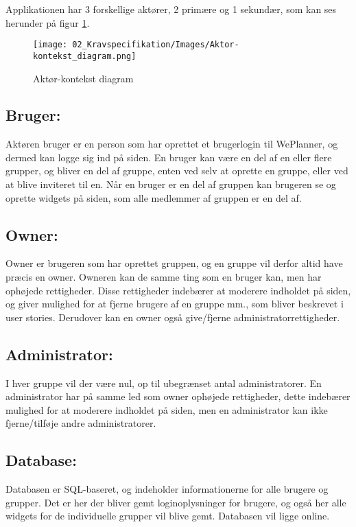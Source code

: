 Applikationen har 3 forskellige aktører, 2 primære og 1 sekundær, som kan ses herunder på figur \ref{fig:aktor_konteks}.
\begin{figure}[H]
  \texttt{[image: 02\_Kravspecifikation/Images/Aktor-kontekst\_diagram.png]}
  \caption{Aktør-kontekst diagram}
  \label{fig:aktor_konteks}
\end{figure}

\subsection{Bruger:}
Aktøren bruger er en person som har oprettet et brugerlogin til WePlanner, og dermed kan logge sig ind på siden. En bruger kan være en del af en eller flere grupper, og bliver en del af gruppe, enten ved selv at oprette en gruppe, eller ved at blive inviteret til en. Når en bruger er en del af gruppen kan brugeren se og oprette widgets på siden, som alle medlemmer af gruppen er en del af. 

\subsection{Owner:} 
Owner er brugeren som har oprettet gruppen, og en gruppe vil derfor altid have præcis en owner. Owneren kan de samme ting som en bruger kan, men har ophøjede rettigheder. Disse rettigheder indebærer at moderere indholdet på siden, og giver mulighed for at fjerne brugere af en gruppe mm., som bliver beskrevet i user stories. Derudover kan en owner også give/fjerne administratorrettigheder.

\subsection{Administrator:}
I hver gruppe vil der være nul, op til ubegrænset antal administratorer. En administrator har på samme led som owner ophøjede rettigheder, dette indebærer mulighed for at moderere indholdet på siden, men en administrator kan ikke fjerne/tilføje andre administratorer.

\subsection{Database:}
Databasen er SQL-baseret, og indeholder informationerne for alle brugere og grupper. Det er her der bliver gemt loginoplysninger for brugere, og også her alle widgets for de individuelle grupper vil blive gemt. Databasen vil ligge online.

